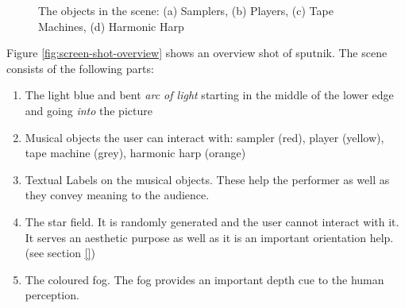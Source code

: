 \documentclass[10pt,a4paper]{scrartcl}
\begin{document}
\begin{figure}[hbtp]
\begin{center}
\caption{The objects in the scene: (a) Samplers, (b) Players, (c) Tape Machines, (d) Harmonic Harp}
\end{center}
\end{figure}


Figure \ref{fig:screen-shot-overview} shows an overview shot of sputnik. The scene consists of the following parts:
\begin{enumerate}
\item The light blue and bent \emph{arc of light} starting in the middle of the lower edge and going \emph{into} the picture
\item Musical objects the user can interact with: sampler (red), player (yellow), tape machine (grey), harmonic harp (orange)
\item Textual Labels on the musical objects. These help the performer as well as they convey meaning to the audience.
\item The star field. It is randomly generated and the user cannot interact with it. It serves an aesthetic  purpose as well as it is an important orientation help. (see section \ref{})
\item The coloured fog. The fog provides an important depth cue to the human perception. 
\end{enumerate}
\end{document}
